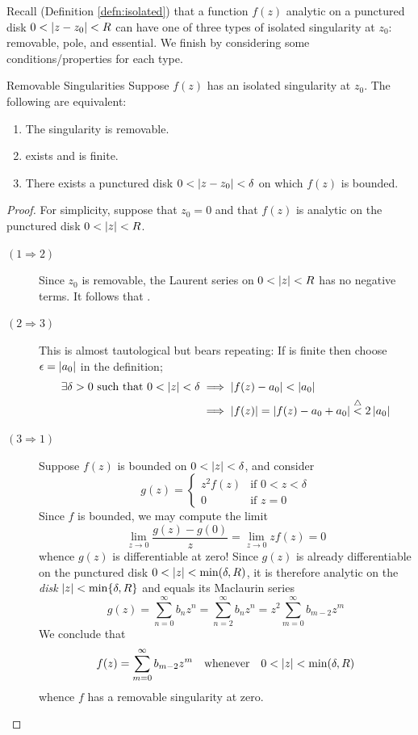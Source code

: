 
Recall (Definition \ref{defn:isolated}) that a function $f(z)$ analytic on a punctured disk $0<\left| z-z_0\right|<R$ can have one of three types of isolated singularity at $z_0$: removable, pole, and essential. We finish by considering some conditions/properties for each type.

\begin{thm}{Removable Singularities}{}
	Suppose $f(z)$ has an isolated singularity at $z_0$. The following are equivalent:
	\begin{enumerate}
		\item The singularity is removable.
		\item {} exists and is finite.
		\item There exists a punctured disk $0<\left| z-z_0\right|<\delta$ on which $f(z)$ is bounded.
	\end{enumerate}
\end{thm}

\begin{proof}
	For simplicity, suppose that $z_0=0$ and that $f(z)$ is analytic on the punctured disk $0<\left| z\right|<R$.
	\begin{description}
	  \item[$(1\Rightarrow 2)$] Since $z_0$ is removable, the Laurent series  on $0<\left| z\right|<R$ has no negative terms. It follows that .
		\item[$(2\Rightarrow 3)$] This is almost tautological but bears repeating: If  is finite then choose $\epsilon=\left| a_0\right|$ in the definition;
		\begin{align*}
			\exists \delta>0\text{ such that }0<\left| z\right|<\delta&\implies \left| f(z)-a_0\right|<\left| a_0\right|\\
			&\implies \left| f(z)\right|=\left| f(z)-a_0+a_0\right|\overset{\triangle}{<}2\left| a_0\right|
		\end{align*}
		\item[$(3\Rightarrow 1)$] Suppose $f(z)$ is bounded on $0<\left| z\right|<\delta$, and consider
		\[
			g(z)=
			\begin{cases}
				z^2f(z)&\text{if }0<z<\delta\\
				0&\text{if }z=0
			\end{cases}
		\]
		Since $f$ is bounded, we may compute the limit
		\[
			\lim_{z\to 0}\frac{g(z)-g(0)}{z}=\lim_{z\to 0}zf(z)=0
		\]
		whence $g(z)$ is differentiable at zero! Since $g(z)$ is already differentiable on the punctured disk $0<\left| z\right|<\min(\delta,R)$, it is therefore analytic on the \emph{disk} $\left| z\right|<\min\{\delta,R\}$ and equals its Maclaurin series
		\[
			g(z)=\sum_{n=0}^\infty b_nz^n
			=\sum_{n=2}^\infty b_nz^n =z^2\sum_{m=0}^\infty b_{m-2}z^m
			\tag{$b_0=g(0)=0$ and $b_1=g'(0)=0$}
		\]
		We conclude that
		\[
			f(z)=\sum_{m=0}^\infty b_{m-2}z^m
			\quad\text{whenever}\quad
			0<\left| z\right|<\min(\delta,R)
		\]
		whence $f$ has a removable singularity at zero.\qedhere
	\end{description}
\end{proof}

